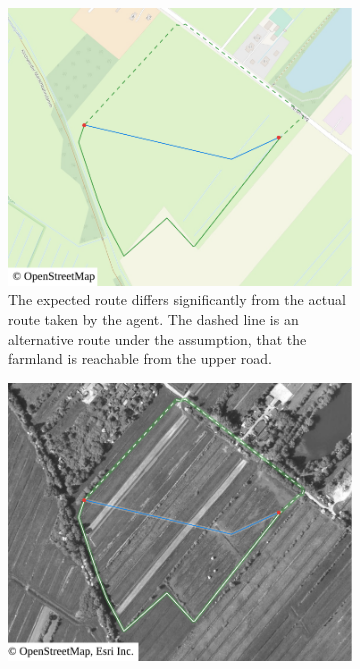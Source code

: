 			\begin{figure}[h!]
				\begin{minipage}[t]{.48\textwidth}
					\begin{subfigure}[t]{\linewidth}
						\includegraphics[width=\textwidth]{images/qgis-routing-rural-routing-6-osm}
						\caption{The expected route differs significantly from the actual route taken by the agent. The dashed line is an alternative route under the assumption, that the farmland is reachable from the upper road.}
						\label{fig:eval-rural-routing-6-osm}
					\end{subfigure}
				\end{minipage}
				\hfill
				\begin{minipage}[t]{.48\textwidth}
					\begin{subfigure}[t]{\linewidth}
						\includegraphics[width=\textwidth]{images/qgis-routing-rural-routing-6-aerial}

\end{subfigure}
\end{minipage}
\end{figure}
